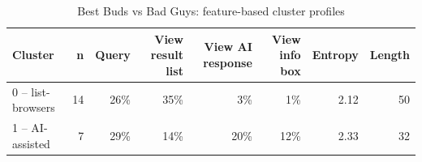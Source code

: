\begin{table}[t]
\centering
\caption{Best Buds vs Bad Guys: feature-based cluster profiles}
\label{tab:rq4-bestbuds-clusters}
\begin{tabular}{lrrrrrrr}
\toprule
Cluster & n & Query & View result list & View AI response & View info box & Entropy & Length \\
\midrule
0 -- list-browsers & 14 & 26\% & 35\% & 3\% & 1\% & 2.12 & 50 \\
1 -- AI-assisted & 7 & 29\% & 14\% & 20\% & 12\% & 2.33 & 32 \\
\bottomrule
\end{tabular}
\end{table}
